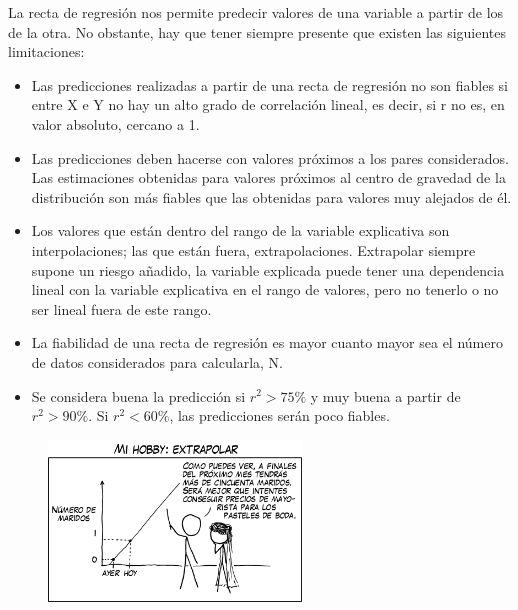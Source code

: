 \begin{definition}
	
La recta de regresión nos permite predecir valores de una variable a partir de los de la otra. No obstante, hay que tener siempre presente que existen las siguientes limitaciones:

\begin{itemize}
\item Las predicciones realizadas a partir de una recta de regresión no son fiables si entre X e Y no hay un alto grado de correlación lineal, es decir, si r no es, en valor absoluto, cercano a 1.
\item Las predicciones deben hacerse con valores próximos a los pares considerados. Las estimaciones obtenidas para valores próximos al centro de gravedad de la distribución son más fiables que las obtenidas para valores muy alejados de él. 
\item Los valores que están dentro del rango de la variable explicativa son interpolaciones; las que están fuera, extrapolaciones. Extrapolar siempre supone un riesgo añadido, la variable explicada puede tener una dependencia lineal con la variable explicativa en el rango de valores, pero no tenerlo o no ser lineal fuera de este rango.
\item La fiabilidad de una recta de regresión es mayor cuanto mayor sea el número de datos considerados para calcularla, N.	
\item Se considera buena la predicción si $r^2>75\%$ y muy buena a partir de $r^2>90\%$. Si $r^2<60\%$, las predicciones serán poco fiables.
\end{itemize}
\end{definition}


\vspace{1cm} %
	\begin{figure}[H]
			\centering
			\includegraphics[width=0.6\textwidth]{imagenes/imagenes03/T03IM11.png}
	\end{figure}
\vspace{1cm} %

